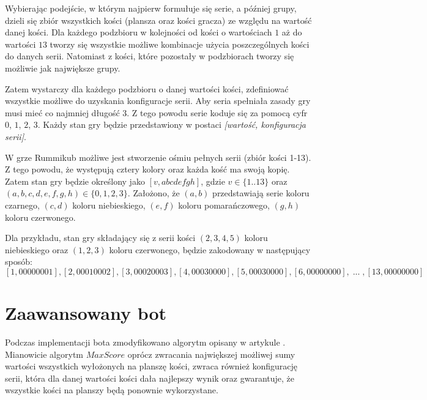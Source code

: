 Wybierając podejście, w którym najpierw formułuje się serie, a później grupy, dzieli się zbiór wszystkich kości (plansza oraz kości gracza) ze względu na wartość danej kości. Dla każdego podzbioru w kolejności od kości o wartościach $1$ aż do wartości $13$ tworzy się wszystkie możliwe kombinacje użycia poszczególnych kości do danych serii. Natomiast z kości, które pozostały w podzbiorach tworzy się możliwie jak największe grupy. 

Zatem wystarczy dla każdego podzbioru o danej wartości kości, zdefiniować wszystkie możliwe do uzyskania konfiguracje serii. Aby seria spełniała zasady gry musi mieć co najmniej długość $3$. Z tego powodu serie koduje się za pomocą cyfr $0$, $1$, $2$, $3$. Każdy stan gry będzie przedstawiony w postaci \emph{[wartość, konfiguracja serii]}.

W grze Rummikub możliwe jest stworzenie ośmiu pełnych serii (zbiór kości 1-13). Z tego powodu, że występują cztery kolory oraz każda kość ma swoją kopię. Zatem stan gry będzie określony jako $[v, abcdefgh]$, gdzie $v \in \{1..13\}$ oraz $(a, b, c, d, e, f, g, h) \in \{0, 1, 2, 3\}$.
 Założono, że $(a, b)$ przedstawiają serie koloru czarnego, $(c, d)$ koloru niebieskiego, $(e, f)$ koloru pomarańczowego, $(g, h)$ koloru czerwonego. 
 
 Dla przykładu, stan gry składający się z serii kości $(2, 3, 4, 5)$ koloru niebieskiego oraz $(1, 2, 3)$ koloru czerwonego, będzie zakodowany w następujący sposób: $$[1, 00000001], [2, 00010002], [3, 00020003], [4, 00030000], [5, 00030000], [6, 00000000], \;  ... \;, [13, 00000000]$$

\section{Zaawansowany bot}

Podczas implementacji bota zmodyfikowano algorytm opisany w artykule \cite{RummikubComplexity}. Mianowicie algorytm $MaxScore$ oprócz zwracania największej możliwej sumy wartości wszystkich wyłożonych na planszę kości, zwraca również konfigurację serii, która dla danej wartości kości dała najlepszy wynik oraz gwarantuje, że wszystkie kości na planszy będą ponownie wykorzystane. \\

